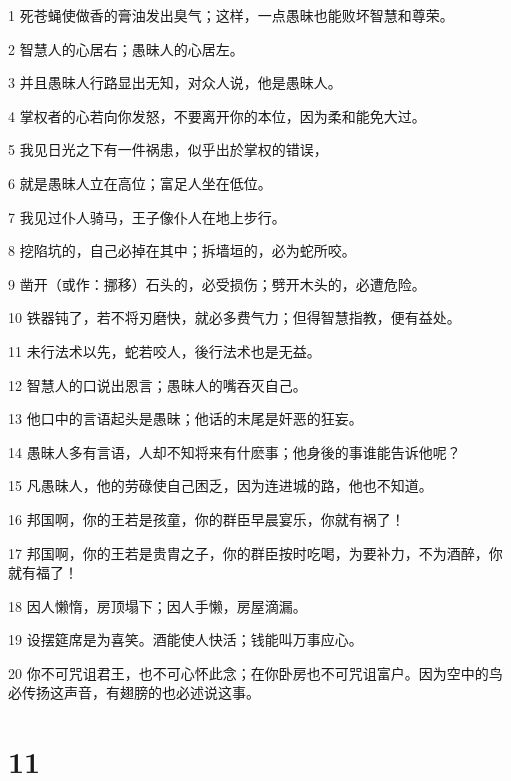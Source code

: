 \par 1 死苍蝇使做香的膏油发出臭气；这样，一点愚昧也能败坏智慧和尊荣。
\par 2 智慧人的心居右；愚昧人的心居左。
\par 3 并且愚昧人行路显出无知，对众人说，他是愚昧人。
\par 4 掌权者的心若向你发怒，不要离开你的本位，因为柔和能免大过。
\par 5 我见日光之下有一件祸患，似乎出於掌权的错误，
\par 6 就是愚昧人立在高位；富足人坐在低位。
\par 7 我见过仆人骑马，王子像仆人在地上步行。
\par 8 挖陷坑的，自己必掉在其中；拆墙垣的，必为蛇所咬。
\par 9 凿开（或作：挪移）石头的，必受损伤；劈开木头的，必遭危险。
\par 10 铁器钝了，若不将刃磨快，就必多费气力；但得智慧指教，便有益处。
\par 11 未行法术以先，蛇若咬人，後行法术也是无益。
\par 12 智慧人的口说出恩言；愚昧人的嘴吞灭自己。
\par 13 他口中的言语起头是愚昧；他话的末尾是奸恶的狂妄。
\par 14 愚昧人多有言语，人却不知将来有什麽事；他身後的事谁能告诉他呢？
\par 15 凡愚昧人，他的劳碌使自己困乏，因为连进城的路，他也不知道。
\par 16 邦国啊，你的王若是孩童，你的群臣早晨宴乐，你就有祸了！
\par 17 邦国啊，你的王若是贵胄之子，你的群臣按时吃喝，为要补力，不为酒醉，你就有福了！
\par 18 因人懒惰，房顶塌下；因人手懒，房屋滴漏。
\par 19 设摆筵席是为喜笑。酒能使人快活；钱能叫万事应心。
\par 20 你不可咒诅君王，也不可心怀此念；在你卧房也不可咒诅富户。因为空中的鸟必传扬这声音，有翅膀的也必述说这事。

\chapter{11}

